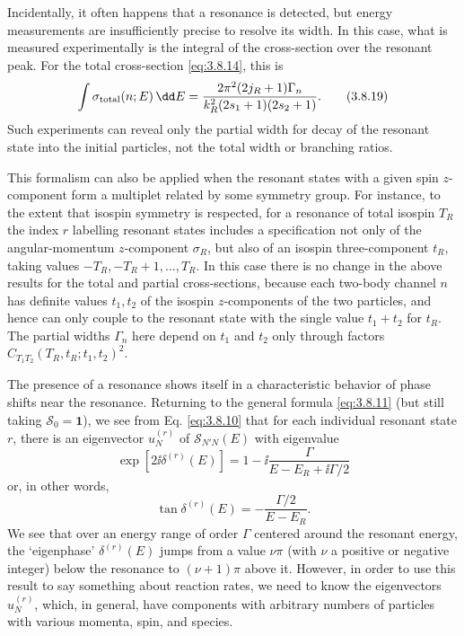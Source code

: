 Incidentally, it often happens that a resonance is detected, but energy
measurements are insufficiently precise to resolve its width. In this case,
what is measured experimentally is the integral of the cross-section over the
resonant peak. For the total cross-section \eqref{eq:3.8.14}, this is
\begin{equation}
  \int\sigma_{\rm total}(n;E)\,\dd E
  =\frac{2\pi^2(2j_R+1)\Gamma_n}
   {k_R^2(2s_1+1)(2s_2+1)}.
  \tag{3.8.19}\label{eq:3.8.19}
\end{equation}
Such experiments can reveal only the partial width for decay of the resonant
state into the initial particles, not the total width or branching ratios.

This formalism can also be applied when the resonant states with a given spin
$z$-component form a multiplet related by some symmetry group. For instance,
to the extent that isospin symmetry is respected, for a resonance of total
isospin $T_R$ the index $r$ labelling resonant states includes a specification
not only of the angular-momentum $z$-component $\sigma_R$, but also of an
isospin three-component $t_R$, taking values $-T_R,-T_R+1,\ldots,T_R$. In
this case there is no change in the above results for the total and partial
cross-sections, because each two-body channel $n$ has definite values $t_1,t_2$
of the isospin $z$-components of the two particles, and hence can only couple
to the resonant state with the single value $t_1+t_2$ for $t_R$. The partial
widths $\Gamma_n$ here depend on $t_1$ and $t_2$ only through factors
$C_{T_1T_2}(T_R,t_R;t_1,t_2)^2$.

The presence of a resonance shows itself in a characteristic behavior of
phase shifts near the resonance. Returning to the general formula \eqref{eq:3.8.11}
(but still taking $\mathcal S_0=\mathbf{1}$), we see from Eq. \eqref{eq:3.8.10} that
for each individual resonant state $r$, there is an eigenvector $u_N^{(r)}$
of $\mathcal S_{N'N}(E)$ with eigenvalue
\[
  \exp[2\ii\delta^{(r)}(E)]
  =1-\ii\frac{\Gamma}{E-E_R+\ii\Gamma/2}
\]
or, in other words,
\begin{equation}
  \tan\delta^{(r)}(E)=-\frac{\Gamma/2}{E-E_R}.
  \tag{3.8.20}\label{eq:3.8.20}
\end{equation}
We see that over an energy range of order $\Gamma$ centered around the
resonant energy, the `eigenphase' $\delta^{(r)}(E)$ jumps from a value
$\nu\pi$ (with $\nu$ a positive or negative integer) below the resonance to
$(\nu+1)\pi$ above it. However, in order to use this result to say something
about reaction rates, we need to know the eigenvectors $u_N^{(r)}$, which, in
general, have components with arbitrary numbers of particles with various
momenta, spin, and species.

